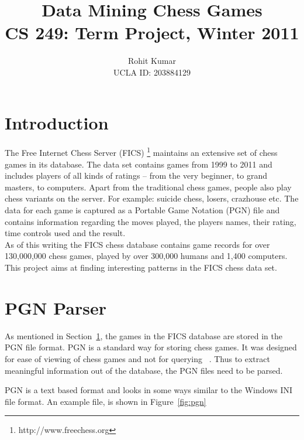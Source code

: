 \documentclass{article}
\author{Rohit Kumar \\UCLA ID: 203884129}
\title{Data Mining Chess Games \\ CS 249: Term Project, Winter 2011}
\begin{document}
\maketitle


\section{Introduction}
\label{sec:intro}
The Free Internet Chess Server (FICS) \footnote{http://www.freechess.org} maintains an extensive set of chess games in its database. The data set contains games from 1999 to 2011 and includes players of all kinds of ratings -- from the very beginner, to grand masters, to computers. Apart from the traditional chess games, people also play chess variants on the server. For example: suicide chess, losers, crazhouse etc. The data for each game is captured as a Portable Game Notation (PGN) \cite{wiki:pgn} file and contains information regarding the moves played, the players names, their rating, time controls used and the result. \\

As of this writing the FICS chess database contains game records for over 130,000,000 chess games, played by over 300,000 humans and 1,400 computers. This project aims at finding interesting patterns in the FICS chess data set.

\section{PGN Parser}

As mentioned in Section~\ref{sec:intro}, the games in the FICS
database are stored in the PGN file format. PGN is a standard way for
storing chess games. It was designed for ease of viewing of chess
games and not for querying ~\cite{spec:pgn}. Thus to extract meaningful information out of the database, the PGN files need to be parsed.

PGN is a text based format and looks in some ways similar to the Windows INI file format. An example file, is shown in Figure~\ref{fig:pgn}
\end{document}
